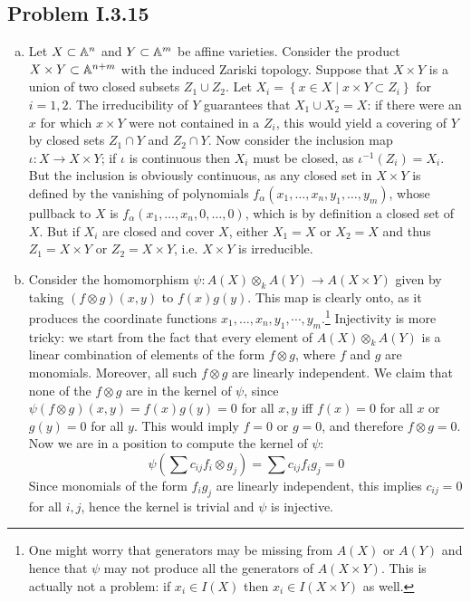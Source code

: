 \documentclass{../mathnotes}
\begin{document}
\subsection*{Problem I.3.15}
\begin{enumerate}[(a)]
    \item Let $X\subset\mathbb{A}^n$ and $Y\subset\mathbb{A}^m$ be affine varieties. Consider the product
        $X\times Y\subset\mathbb{A}^{n+m}$ with the induced Zariski topology. Suppose that $X\times Y$
        is a union of two closed subsets $Z_1\cup Z_2$. Let $X_i=\left\{ x\in X\mid x\times Y\subset Z_i \right\}$
        for $i=1,2$. The irreducibility of $Y$ guarantees that $X_1\cup X_2=X$: if there were
        an $x$ for which $x\times Y$ were not contained in a $Z_i$, this would yield a
        covering of $Y$ by closed sets $Z_1\cap Y$ and $Z_2\cap Y$. Now consider the inclusion
        map $\iota:X\to X\times Y$; if $\iota$ is continuous then $X_i$ must be closed, as
        $\iota^{-1}(Z_i)=X_i$. But the inclusion is obviously continuous, as any closed set
        in $X\times Y$ is defined by the vanishing of polynomials $f_\alpha(x_1,\ldots,x_n,y_1,\ldots, y_m)$,
        whose pullback to $X$ is $f_\alpha(x_1,\ldots,x_n,0,\ldots,0)$, which is by definition
        a closed set of $X$. But if $X_i$ are closed and cover $X$, either $X_1=X$ or $X_2=X$
        and thus $Z_1=X\times Y$ or $Z_2=X\times Y$, i.e. $X\times Y$ is irreducible.
    \item Consider the homomorphism $\psi:A(X)\otimes_kA(Y)\to A(X\times Y)$ given by taking $(f\otimes g)(x,y)$
        to $f(x)g(y)$. This map is clearly onto, as it produces the coordinate functions
        $x_1,\ldots,x_n,y_1,\cdots,y_m$.\footnote{One might worry that generators may be missing from
        $A(X)$ or $A(Y)$ and hence that $\psi$ may not produce all the generators of $A(X\times Y)$.
        This is actually not a problem: if $x_i\in I(X)$ then $x_i\in I(X\times Y)$ as well.}
        Injectivity is more tricky: we start from the fact that every element of $A(X) \otimes_k A(Y)$ is a linear combination of elements of the form $f \otimes g$, where $f$ and $g$ are monomials. Moreover, all such $f \otimes g$ are linearly independent. We claim that none of the $f \otimes g$ are in the kernel of $\psi$, since $\psi(f \otimes g) (x,y)= f(x)g(y) = 0$ for all $x,y$ iff $f(x) = 0$ for all $x$ or $g(y) = 0$ for all $y$. This would imply $f=0$ or $g=0$, and therefore $f\otimes g = 0$. Now we are in a position to compute the kernel of $\psi$:
\[  \psi (\sum c_{ij} f_i \otimes g_j) = \sum c_{ij} f_i g_j = 0  \]
Since monomials of the form $f_i g_j$ are linearly independent, this implies $c_{ij} = 0$ for all $i,j$, hence the kernel is trivial and $\psi$ is injective.


\end{enumerate}
\end{document}

